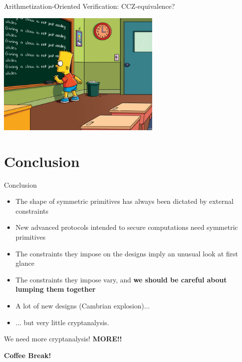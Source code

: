 \documentclass[presentation,aspectratio=1610]{beamer}
\begin{document}
\begin{frame}{Arithmetization-Oriented Verification: CCZ-equivalence?}
  \vfill

  \begin{center}
    \includegraphics[width=8cm]{./figures/simpsons}
  \end{center}
  
  \vfill
\end{frame}



\section{Conclusion}




\begin{frame}{Conclusion}
  ~
  {
    \begin{itemize}
    \item The shape of symmetric primitives has always been dictated by \alert{external constraints} \pause
    \item New \alert{advanced protocols} intended to secure \alert{computations} need symmetric primitives \pause
    \item The constraints they impose on the designs imply an \alert{unusual look at first glance} \pause
    \item The constraints they impose \alert{vary}, and \textbf{we should be careful about lumping them together} \pause
      
    \item A lot of new designs (\alert{Cambrian explosion})... \pause
    \item ... but very little cryptanalysis.
    \end{itemize}
  }
  \pause\vspace{1cm}
  
  \begin{center}
    \large{\alert{We need more cryptanalysis! \pause \textbf{MORE!!}}}

    \pause\vspace{1cm}
    \textbf{Coffee Break!}
  \end{center}
\end{frame}

\appendix



\end{document}
